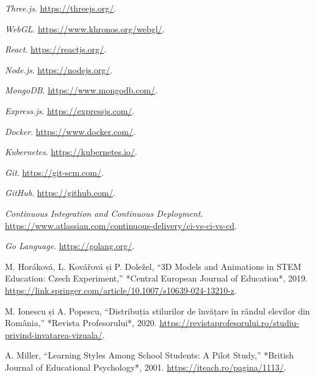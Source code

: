 \documentclass{thesis.cs.pub.ro}
\begin{document}
\begin{thebibliography}{99}

\textit{Three.js}. \href{https://threejs.org/}{https://threejs.org/}.

\textit{WebGL}. \href{https://www.khronos.org/webgl/}{https://www.khronos.org/webgl/}.

\textit{React}. \href{https://reactjs.org/}{https://reactjs.org/}.

\textit{Node.js}. \href{https://nodejs.org/}{https://nodejs.org/}.

\textit{MongoDB}. \href{https://www.mongodb.com/}{https://www.mongodb.com/}.

\textit{Express.js}. \href{https://expressjs.com/}{https://expressjs.com/}.

\textit{Docker}. \href{https://www.docker.com/}{https://www.docker.com/}.

\textit{Kubernetes}. \href{https://kubernetes.io/}{https://kubernetes.io/}.

\textit{Git}. \href{https://git-scm.com/}{https://git-scm.com/}.

\textit{GitHub}. \href{https://github.com/}{https://github.com/}.

\textit{Continuous Integration and Continuous Deployment}. \href{https://www.atlassian.com/continuous-delivery/ci-vs-ci-vs-cd}{https://www.atlassian.com/continuous-delivery/ci-vs-ci-vs-cd}.

\textit{Go Language}. \href{https://golang.org/}{https://golang.org/}.


M. Horáková, L. Kovářová și P. Doležel, “3D Models and Animations in STEM Education: Czech Experiment,” *Central European Journal of Education*, 2019. \href{https://link.springer.com/article/10.1007/s10639-024-13210-z}{https://link.springer.com/article/10.1007/s10639-024-13210-z}.

M. Ionescu și A. Popescu, “Distribuția stilurilor de învățare în rândul elevilor din România,” *Revista Profesorului*, 2020. \href{https://revistaprofesorului.ro/studiu-privind-invatarea-vizuala/}{https://revistaprofesorului.ro/studiu-privind-invatarea-vizuala/}.

A. Miller, “Learning Styles Among School Students: A Pilot Study,” *British Journal of Educational Psychology*, 2001. \href{https://iteach.ro/pagina/1113/}{https://iteach.ro/pagina/1113/}.


\end{thebibliography}
\end{document}
